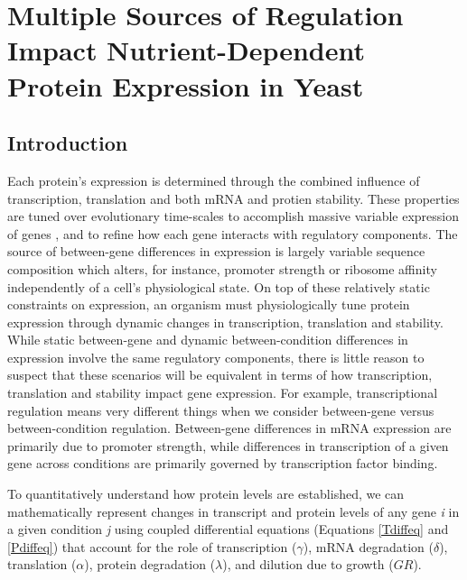 \chapter{Multiple Sources of Regulation Impact Nutrient-Dependent Protein Expression in Yeast\label{ch:pt_compare}}

\section{Introduction}

Each protein's expression is determined through the combined influence of transcription, translation and both mRNA and protien stability. These properties are tuned over evolutionary time-scales to accomplish massive variable expression of genes \cite{Csardi:2015kx}, and to refine how each gene interacts with regulatory components.  The source of between-gene differences in expression is largely variable sequence composition which alters, for instance, promoter strength or ribosome affinity independently of a cell's physiological state. On top of these relatively static constraints on expression, an organism must physiologically tune protein expression through dynamic changes in transcription, translation and stability.  While static between-gene and dynamic between-condition differences in expression involve the same regulatory components, there is little reason to suspect that these scenarios will be equivalent in terms of how transcription, translation and stability impact gene expression.  For example, transcriptional regulation means very different things when we consider between-gene versus between-condition regulation.  Between-gene differences in mRNA expression are primarily due to promoter strength, while differences in transcription of a given gene across conditions are primarily governed by transcription factor binding.  

 
To quantitatively understand how protein levels are established, we can mathematically represent changes in transcript and protein levels of any gene \textit{i} in a given condition \textit{j} using coupled differential equations (Equations \ref{Tdiffeq} and  \ref{Pdiffeq}) that account for the role of transcription ($\gamma$), mRNA degradation ($\delta$), translation ($\alpha$), protein degradation ($\lambda$), and dilution due to growth ($GR$).  

